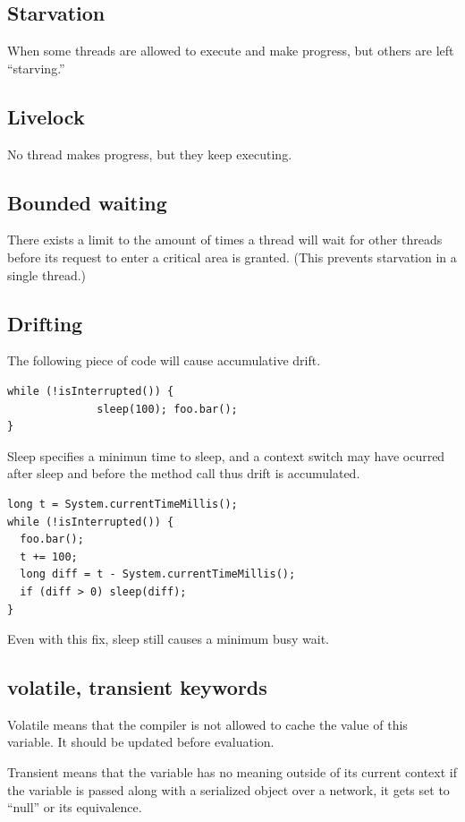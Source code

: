 \documentclass[a4paper]{article}
\begin{document}
\subsection{Starvation}
When some threads are allowed to execute and make progress, but others are
left ``starving.''

\subsection{Livelock}
No thread makes progress, but they keep executing.

\subsection{Bounded waiting}
There exists a limit to the amount of times a thread will wait for other
threads before its request to enter a critical area is granted. (This
prevents starvation in a single thread.)

\subsection{Drifting}
The following piece of code will cause accumulative drift.
\begin{lstlisting}[label=drift,caption=Drift example]
while (!isInterrupted()) {
              sleep(100); foo.bar();
}
\end{lstlisting}

Sleep specifies a minimun time to sleep, and a context switch may have ocurred
after sleep and before the method call thus drift is accumulated.

\begin{lstlisting}[label=drift-fix,caption=Drift fixed]
long t = System.currentTimeMillis();
while (!isInterrupted()) {
  foo.bar();
  t += 100;
  long diff = t - System.currentTimeMillis();
  if (diff > 0) sleep(diff);
}
\end{lstlisting}

Even with this fix, sleep still causes a minimum busy wait.

\subsection{volatile, transient keywords}
Volatile means that the compiler is not allowed to cache the value of this
variable. It should be updated before evaluation.

Transient means that the variable has no meaning outside of its current context
if the variable is passed along with a serialized object over a network, it
gets set to ``null'' or its equivalence.
\end{document}
